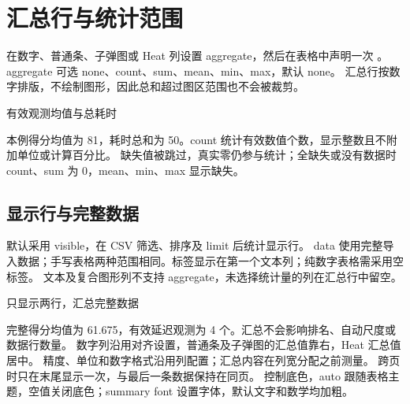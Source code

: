 \section{汇总行与统计范围}
\label{sec:summary}
在数字、普通条、子弹图或 Heat 列设置 aggregate，然后在表格中声明一次 。
aggregate 可选 none、count、sum、mean、min、max，默认 none。
汇总行按数字排版，不绘制图形，因此总和超过图区范围也不会被裁剪。
\begin{example}[text and listing,sidebyside=false]{有效观测均值与总耗时}
\begin{center}
\begin{gradtable}[align=c,header align=c,style=academic,theme=teal,width=\linewidth]
\end{gradtable}
\end{center}
\end{example}
本例得分均值为 81，耗时总和为 50。count 统计有效数值个数，显示整数且不附加单位或计算百分比。
缺失值被跳过，真实零仍参与统计；全缺失或没有数据时 count、sum 为 0，mean、min、max 显示缺失。
\subsection{显示行与完整数据}
 默认采用 visible，在 CSV 筛选、排序及 limit 后统计显示行。
data 使用完整导入数据；手写表格两种范围相同。标签显示在第一个文本列；纯数字表格需采用空标签。
文本及复合图形列不支持 aggregate，未选择统计量的列在汇总行中留空。
\begin{example}[text and listing,sidebyside=false]{只显示两行，汇总完整数据}
\begin{center}
\begin{gradtable}[align=c,header align=c,style=compact,data=results,width=\linewidth,
  sort=score,order=descending,limit=2]
\end{gradtable}
\end{center}
\end{example}
完整得分均值为 61.675，有效延迟观测为 4 个。汇总不会影响排名、自动尺度或数据行数量。
数字列沿用对齐设置，普通条及子弹图的汇总值靠右，Heat 汇总值居中。
精度、单位和数字格式沿用列配置；汇总内容在列宽分配之前测量。
跨页时只在末尾显示一次，与最后一条数据保持在同页。
 控制底色，auto 跟随表格主题，空值关闭底色；summary font 设置字体，默认文字和数学均加粗。


